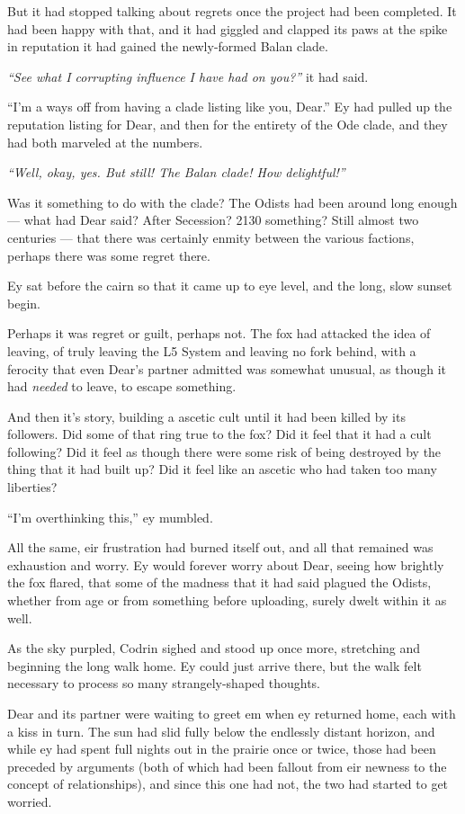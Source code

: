 But it had stopped talking about regrets once the project had been completed. It had been happy with that, and it had giggled and clapped its paws at the spike in reputation it had gained the newly-formed Balan clade.

\emph{``See what I corrupting influence I have had on you?''} it had said.

``I'm a ways off from having a clade listing like you, Dear.'' Ey had pulled up the reputation listing for Dear, and then for the entirety of the Ode clade, and they had both marveled at the numbers.

\emph{``Well, okay, yes. But still! The Balan clade! How delightful!''}

Was it something to do with the clade? The Odists had been around long enough — what had Dear said? After Secession? 2130 something? Still almost two centuries — that there was certainly enmity between the various factions, perhaps there was some regret there.

Ey sat before the cairn so that it came up to eye level, and the long, slow sunset begin.

Perhaps it was regret or guilt, perhaps not. The fox had attacked the idea of leaving, of truly leaving the L5 System and leaving no fork behind, with a ferocity that even Dear's partner admitted was somewhat unusual, as though it had \emph{needed} to leave, to escape something.

And then it's story, building a ascetic cult until it had been killed by its followers. Did some of that ring true to the fox? Did it feel that it had a cult following? Did it feel as though there were some risk of being destroyed by the thing that it had built up? Did it feel like an ascetic who had taken too many liberties?

``I'm overthinking this,'' ey mumbled.

All the same, eir frustration had burned itself out, and all that remained was exhaustion and worry. Ey would forever worry about Dear, seeing how brightly the fox flared, that some of the madness that it had said plagued the Odists, whether from age or from something before uploading, surely dwelt within it as well.

As the sky purpled, Codrin sighed and stood up once more, stretching and beginning the long walk home. Ey could just arrive there, but the walk felt necessary to process so many strangely-shaped thoughts.

Dear and its partner were waiting to greet em when ey returned home, each with a kiss in turn. The sun had slid fully below the endlessly distant horizon, and while ey had spent full nights out in the prairie once or twice, those had been preceded by arguments (both of which had been fallout from eir newness to the concept of relationships), and since this one had not, the two had started to get worried.

